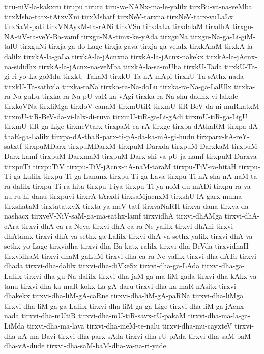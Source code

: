 {tiru-niV-la-kakxru
tirupu
tirura
tiru-va-NANx-ma-le-yalilx
tirxBu-va-na-veMba
tirxMsha-tatx-tAtxvXni
tirxMshatf
tirxNeV-tarxna
tirxNeV-tarx-vuLaLx
tirxSaM-pati
tirxVNAyxM-ta-rANi
tirxVSu
tirxdaLa
tirxdalaM
tirxdhA
tirxgu-NA-tiV-ta-veY-Ba-vamf
tirxgu-NA-timx-ke-yAda
tirxguNa
tirxgu-Na-ga-Li-giM-talU
tirxguNi
tirxja-ga-do-Lage
tirxja-gava
tirxja-ga-velalx
tirxkAlaM
tirxkA-la-dalilx
tirxkA-la-gaLa
tirxkA-la-jAcnxna
tirxkA-la-jAcnx-nakekx
tirxkA-la-jAcnx-na-sididhx
tirxkA-la-jAcnx-na-veMba
tirxkA-la-sa-mUha
tirxkU-Tada
tirxkU-Ta-gi-ri-yo-La-goMdu
tirxkU-TakaM
tirxkU-Ta-nA-mApi
tirxkU-Ta-sAthx-nada
tirxkU-Ta-sathxla
tirxka-raNa
tirxka-ra-Na-doLu
tirxka-ra-Na-ga-LalUlx
tirxka-ra-Na-gaLu
tirxka-ra-Na-pU-vaR-ka-vAgi
tirxka-ra-Na-shu-dadhx-vi-lalxde
tirxkoVNa
tirxliMga
tirxloV-canaM
tirxmUtiR
tirxmU-tiR-BeV-da-ni-muRkatxM
tirxmU-tiR-BeV-da-vi-lalx-di-ruva
tirxmU-tiR-ga-Li-gAdi
tirxmU-tiR-ga-LigU
tirxmU-tiR-ga-Lige
tirxneVtarx
tirxpaM-ca-rA-tirxge
tirxpa-dAthaRM
tirxpa-dA-thaR-ga-Lalilx
tirxpa-dA-thaR-parx-ti-pA-da-ka-mA-gi-hudu
tirxparx-kA-reY-satxtf
tirxpuMDarx
tirxpuMDarxM
tirxpuM-Darxda
tirxpuM-DarxkaM
tirxpuM-Darx-kamf
tirxpuM-DarxmaM
tirxpuM-Darx-shi-va-pU-ja-namf
tirxpuM-Darxva
tirxpuTi
tirxpuTiV
tirxpu-TiV-jAcnx-nA-naM-taraM
tirxpu-TiV-ra-hitaH
tirxpu-Ti-ga-Lalilx
tirxpu-Ti-ga-Lanunx
tirxpu-Ti-ga-Lava
tirxpu-Ti-nA-sha-nA-naM-ta-ra-dalilx
tirxpu-Ti-ra-hita
tirxpu-Tiya
tirxpu-Ti-ya-noM-du-mADi
tirxpu-ra-va-nu-ru-hi-danu
tirxpuvi
tirxrA-tArxdi
tirxsaMjacnxM
tirxshU-lA-garx-muma
tirxshataM
tirxtatatxvX
tirxta-ya-meV-tatf
tirxvaNaRH
tirxva-dana
tirxva-da-nashacx
tirxveV-NiV-saM-ga-ma-sathx-lamf
tirxvidhA
tirxvi-dhAMga
tirxvi-dhA-cAra
tirxvi-dhA-ca-ra-Neya
tirxvi-dhA-ca-ra-Ne-yalilx
tirxvi-dhAni
tirxvi-dhAtamx
tirxvi-dhA-va-sethx-ga-Lalilx
tirxvi-dhA-va-sethx-yalilx
tirxvi-dhA-va-sethx-yo-Lage
tirxvidha
tirxvi-dha-Ba-katx-ralilx
tirxvi-dha-BeVda
tirxvidhaH
tirxvidhaM
tirxvi-dhaM-gaLuM
tirxvi-dha-ca-ra-Ne-yalilx
tirxvi-dha-dATa
tirxvi-dhada
tirxvi-dha-dalilx
tirxvi-dha-diVkeSx
tirxvi-dha-ga-LAda
tirxvi-dha-ga-Lalilx
tirxvi-dha-gu-Na-dalilx
tirxvi-dha-jaM-ga-ma-liM-gada
tirxvi-dha-kAkx-ya-tanu
tirxvi-dha-ka-maR-kokx-La-gA-daru
tirxvi-dha-ka-maR-nAsitx
tirxvi-dhakekx
tirxvi-dha-liM-gA-caRne
tirxvi-dha-liM-gA-paRNa
tirxvi-dha-liMga
tirxvi-dha-liM-ga-ga-Lalilx
tirxvi-dha-liM-ga-ga-Lige
tirxvi-dha-liM-ga-jAcnx-nada
tirxvi-dha-mUtiR
tirxvi-dha-mU-tiR-savx-rU-pakaM
tirxvi-dha-ma-la-ga-LiMda
tirxvi-dha-ma-lava
tirxvi-dha-meM-te-nalu
tirxvi-dha-mu-cayxteV
tirxvi-dha-nA-ma-Bavi
tirxvi-dha-parx-sAda
tirxvi-dha-rU-pAda
tirxvi-dha-saM-baM-dha-vA-dude
tirxvi-dha-saM-baM-dha-va-na-ri-yade
}
